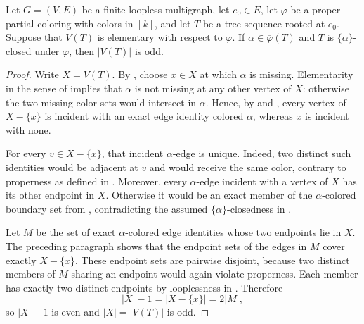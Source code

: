 \begin{lemma}
Let $G=(V,E)$ be a finite loopless multigraph, let $e_0\in E$, let
$\varphi$ be a proper partial coloring with colors in $[k]$, and let $T$
be a tree-sequence rooted at $e_0$.  Suppose that $V(T)$ is elementary
with respect to $\varphi$.  If
$\alpha\in\overline\varphi(T)$ and $T$ is
$\{\alpha\}$-closed under $\varphi$, then $|V(T)|$ is odd.
\end{lemma}
\begin{proof}
Write $X=V(T)$.  By , choose
$x\in X$ at which $\alpha$ is missing.  Elementarity in the sense of
 implies that $\alpha$ is not missing
at any other vertex of $X$: otherwise the two missing-color sets would
intersect in $\alpha$.  Hence, by  and
, every vertex of $X-\{x\}$ is incident with an
exact edge identity colored $\alpha$, whereas $x$ is incident with none.

For every $v\in X-\{x\}$, that incident $\alpha$-edge is unique.  Indeed,
two distinct such identities would be adjacent at $v$ and would receive
the same color, contrary to properness as defined in
.  Moreover, every $\alpha$-edge incident
with a vertex of $X$ has its other endpoint in $X$.  Otherwise it would
be an exact member of the $\alpha$-colored boundary set from
, contradicting the assumed
$\{\alpha\}$-closedness in .

Let $M$ be the set of exact $\alpha$-colored edge identities whose two
endpoints lie in $X$.  The preceding paragraph shows that the endpoint
sets of the edges in $M$ cover exactly $X-\{x\}$.  These endpoint sets are
pairwise disjoint, because two distinct members of $M$ sharing an endpoint
would again violate properness.  Each member has exactly two distinct
endpoints by looplessness in .  Therefore
\[
 |X|-1=|X-\{x\}|=2|M|,
\]
so $|X|-1$ is even and $|X|=|V(T)|$ is odd.
\end{proof}
